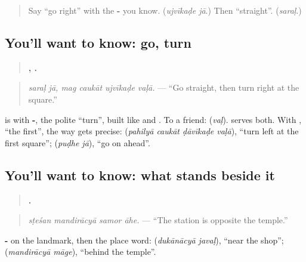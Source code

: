 \label{lesson:MR-C282-ujvikade-vala}



\begin{quote}
Say \textquotedblleft{}go right\textquotedblright{} with the \textbf{-} you know. (\emph{ujvīkaḍe jā}.) Then \textquotedblleft{}straight\textquotedblright{}. (\emph{saraḷ}.)
\end{quote}

\subsection*{You'll want to know: go, turn}
\begin{quote}
\textbf{ ,    .}
\end{quote}

\begin{quote}
\emph{saraḷ jā, mag caukāt ujvīkaḍe vaḷā.} — \textquotedblleft{}Go straight, then turn right at the square.\textquotedblright{}
\end{quote}

\textbf{} is \textbf{} with \textbf{-}, the polite \textquotedblleft{}turn\textquotedblright{}, built like \textbf{} and \textbf{}. To a friend: \textbf{} (\emph{vaḷ}). \textbf{} serves both. With \textbf{}, \textquotedblleft{}the first\textquotedblright{}, the way gets precise: \textbf{   } (\emph{pahilyā caukāt ḍāvīkaḍe vaḷā}), \textquotedblleft{}turn left at the first square\textquotedblright{}; \textbf{ } (\emph{puḍhe jā}), \textquotedblleft{}go on ahead\textquotedblright{}.

\subsection*{You'll want to know: what stands beside it}
\begin{quote}
\textbf{   .}
\end{quote}

\begin{quote}
\emph{sṭeśan mandirācyā samor āhe.} — \textquotedblleft{}The station is opposite the temple.\textquotedblright{}
\end{quote}

\textbf{-} on the landmark, then the place word: \textbf{ } (\emph{dukānācyā javaḷ}), \textquotedblleft{}near the shop\textquotedblright{}; \textbf{ } (\emph{mandirācyā māge}), \textquotedblleft{}behind the temple\textquotedblright{}.


